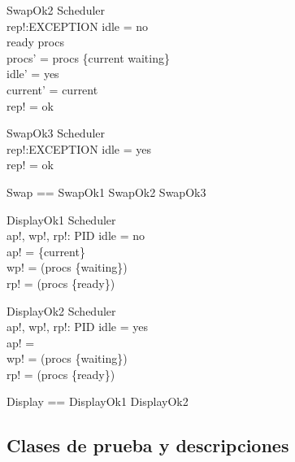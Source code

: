 \begin{schema}{SwapOk2}
\Delta Scheduler \\
rep!:EXCEPTION
\where
idle = no \\
ready \notin \ran procs \\
procs' = procs \cup \{current \mapsto waiting\}\\
idle' = yes \\
current' = current \\
rep! = ok
\end{schema}

\begin{schema}{SwapOk3}
\Xi Scheduler \\
rep!:EXCEPTION
\where
idle = yes \\
rep! = ok
\end{schema}

\begin{zed}
Swap == SwapOk1 \lor SwapOk2 \lor SwapOk3
\end{zed}

\begin{schema}{DisplayOk1}
\Xi Scheduler \\
ap!, wp!, rp!: \power PID 
\where
idle = no \\
ap! = \{current\} \\
wp! = \dom (procs \rres \{waiting\}) \\
rp! = \dom (procs \rres \{ready\})
\end{schema}

\begin{schema}{DisplayOk2}
\Xi Scheduler \\
ap!, wp!, rp!: \power PID 
\where
idle = yes \\
ap! = \emptyset \\
wp! = \dom (procs \rres \{waiting\}) \\
rp! = \dom (procs \rres \{ready\})
\end{schema}

\begin{zed}
Display == DisplayOk1 \lor DisplayOk2
\end{zed}

\subsection*{Clases de prueba y descripciones}